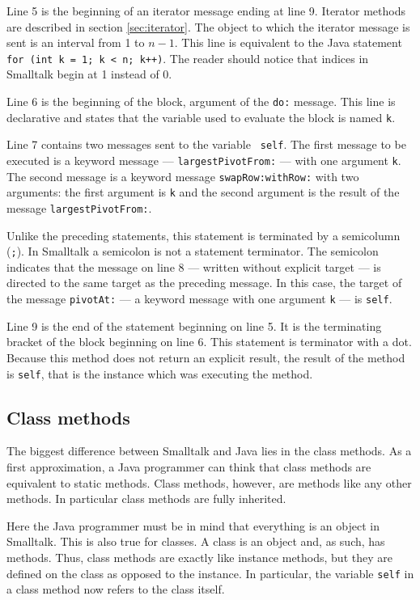 \documentclass[twoside]{book}
\begin{document}
\noindent Line 5 is the beginning of an iterator message ending at
line 9. Iterator methods are described in section
\ref{sec:iterator}. The object to which the iterator message is
sent is an interval from 1 to $n-1$. This line is equivalent to
the Java statement {\tt for (int k = 1; k < n; k++)}. The reader
should notice that indices in Smalltalk begin at 1 instead of 0.

\noindent Line 6 is the beginning of the block, argument
of the {\tt do:} message. This line is declarative and states that
the variable used to evaluate the block is named {\tt k}.

\noindent Line 7 contains two messages sent to the variable {\tt
self}. The first message to be executed is a keyword message
--- {\tt largestPivotFrom:} --- with one argument {\tt k}. The
second message is a keyword message {\tt swapRow:withRow:} with
two arguments: the first argument is {\tt k} and the second
argument is the result of the message {\tt largestPivotFrom:}.

\noindent Unlike the preceding statements, this statement is
terminated by a semicolumn ({\tt ;}). In Smalltalk a semicolon is
not a statement terminator. The semicolon indicates that the
message on line 8 --- written without explicit target --- is
directed to the same target as the preceding message. In this
case, the target of the message {\tt pivotAt:} --- a keyword
message with one argument {\tt k} --- is {\tt self}.

\noindent Line 9 is the end of the statement beginning on line 5.
It is the terminating bracket of the block beginning on
line 6. This statement is terminator with a dot. Because this
method does not return an explicit result, the result of the
method is {\tt self}, that is the instance which was executing the
method.

\subsection{Class methods}
The biggest difference between Smalltalk and Java lies in the
class methods. As a first approximation, a Java programmer can
think that class methods are equivalent to static methods. Class
methods, however, are methods like any other methods. In
particular class methods are fully inherited.

Here the Java programmer must be in mind that everything is an
object in Smalltalk. This is also true for classes. A class is an
object and, as such, has methods. Thus, class methods are exactly
like instance methods, but they are defined on the class as
opposed to the instance. In particular, the variable {\tt self} in
a class method now refers to the class itself.
\end{document}
